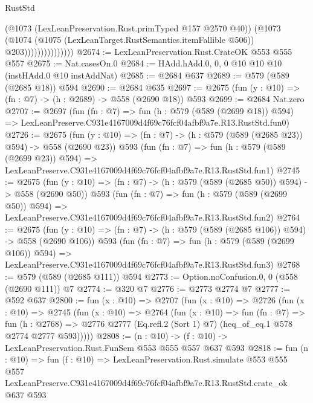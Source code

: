 \begin{lexlean}{RustStd}
\begin{coremodule}
                              (@1073 (LexLeanPreservation.Rust.primTyped @157 @2570 @40))
                              (@1073
                                (@1074
                                  (@1075 (LexLeanTarget.RustSemantics.itemFallible @506))
                                  @203)))))))))))))))
@2674 := LexLeanPreservation.Rust.CrateOK @553 @555 @557
@2675 := Nat.casesOn.{0}
@2684 := HAdd.hAdd.{0, 0, 0} @10 @10 @10 (instHAdd.{0} @10 instAddNat)
@2685 := @2684 @637
@2689 := @579 (@589 (@2685 @18)) @594
@2690 := @2684 @635
@2697 := @2675 (fun (y : @10) => (fn : @7) -> (h : @2689) -> @558 (@2690 @18)) @593
@2699 := @2684 Nat.zero
@2707 := @2697
    (fun (fn : @7) =>
    fun (h : @579 (@589 (@2699 @18)) @594) =>
    LexLeanPreserve.C931e4167009d4f69c76fcf04afbf9a7e.R13.RustStd.fun0)
@2726 := @2675
    (fun (y : @10) => (fn : @7) -> (h : @579 (@589 (@2685 @23)) @594) -> @558 (@2690 @23))
    @593
    (fun (fn : @7) =>
    fun (h : @579 (@589 (@2699 @23)) @594) =>
    LexLeanPreserve.C931e4167009d4f69c76fcf04afbf9a7e.R13.RustStd.fun1)
@2745 := @2675
    (fun (y : @10) => (fn : @7) -> (h : @579 (@589 (@2685 @50)) @594) -> @558 (@2690 @50))
    @593
    (fun (fn : @7) =>
    fun (h : @579 (@589 (@2699 @50)) @594) =>
    LexLeanPreserve.C931e4167009d4f69c76fcf04afbf9a7e.R13.RustStd.fun2)
@2764 := @2675
    (fun (y : @10) => (fn : @7) -> (h : @579 (@589 (@2685 @106)) @594) -> @558 (@2690 @106))
    @593
    (fun (fn : @7) =>
    fun (h : @579 (@589 (@2699 @106)) @594) =>
    LexLeanPreserve.C931e4167009d4f69c76fcf04afbf9a7e.R13.RustStd.fun3)
@2768 := @579 (@589 (@2685 @111)) @594
@2773 := Option.noConfusion.{0, 0} (@558 (@2690 @111)) @7
@2774 := @320 @7
@2776 := @2773 @2774 @7
@2777 := @592 @637
@2800 := fun (x : @10) =>
  @2707
    (fun (x : @10) =>
    @2726
      (fun (x : @10) =>
      @2745
        (fun (x : @10) =>
        @2764
          (fun (x : @10) =>
          fun (fn : @7) =>
          fun (h : @2768) =>
          @2776 @2777 (Eq.refl.{2} (Sort 1) @7) (heq_of_eq.{1} @578 @2774 @2777 @593)))))
@2808 := (n : @10) -> (f : @10) -> LexLeanPreservation.Rust.FunSem @553 @555 @557 @637 @593
@2818 := fun (n : @10) =>
  fun (f : @10) =>
  LexLeanPreservation.Rust.simulate
    @553
    @555
    @557
    LexLeanPreserve.C931e4167009d4f69c76fcf04afbf9a7e.R13.RustStd.crate_ok
    @637
    @593
\end{coremodule}
\end{lexlean}

